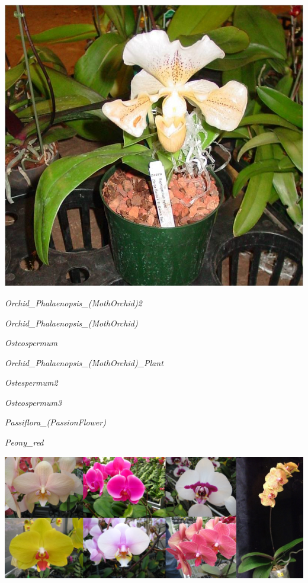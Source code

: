 \documentclass{article}
\begin{document}
\begin{center}
\includegraphics[height=0.9\textheight, angle=90]{../Orchid_Paphiopedilum_(Lady-Slipper)2.jpg}
\end{center}
\newpage

\noindent
\vfill
\centerline{{\Large\emph{Orchid_Phalaenopsis_(MothOrchid)2}}}
\vfill
\newpage

\noindent
\vfill
\centerline{{\Large\emph{Orchid_Phalaenopsis_(MothOrchid)}}}
\vfill
\newpage

\noindent
\vfill
\centerline{{\Large\emph{Osteospermum}}}
\vfill
\newpage

\noindent
\vfill
\centerline{{\Large\emph{Orchid_Phalaenopsis_(MothOrchid)_Plant}}}
\vfill
\newpage

\noindent
\vfill
\centerline{{\Large\emph{Ostespermum2}}}
\vfill
\newpage

\noindent
\vfill
\centerline{{\Large\emph{Osteospermum3}}}
\vfill
\newpage

\noindent
\vfill
\centerline{{\Large\emph{Passiflora_(PassionFlower)}}}
\vfill
\newpage

\noindent
\vfill
\centerline{{\Large\emph{Peony_red}}}
\vfill
\newpage

\begin{center}
\includegraphics[height=0.9\textheight, angle=90]{../Orchid_Phalaenopsis_(MothOrchid).jpg}
\end{center}
\newpage
\end{document}
